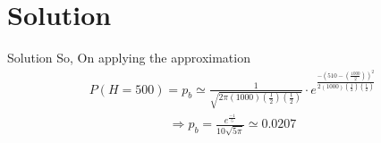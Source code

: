 \documentclass{beamer}
\begin{document}
\section{Solution}
\begin{frame}{Solution}
    So, On applying the approximation
    \begin{align}
        P(H = 500) = p_b \simeq \frac{1}{\sqrt{2 \pi (1000)(\frac{1}{2})(\frac{1}{2})}} \cdot e^{\frac{-(510-(\frac{1000}{2}))^2}{2(1000)(\frac{1}{2})(\frac{1}{2})}}
    \end{align}
    \begin{align}
        \Rightarrow \boxed{p_b = \frac{e^{\frac{-1}{5}}}{10 \sqrt{5 \pi}} \simeq 0.0207}
    \end{align}
\end{frame}
\end{document}
